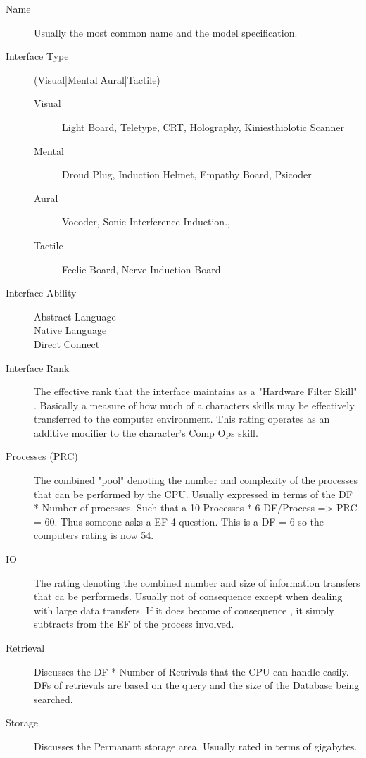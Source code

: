 \begin{description}
	\item[Name]
	Usually the most common name and the model specification.
	\item[Interface Type]
	(Visual|Mental|Aural|Tactile)
	\begin{description}
		\item[Visual]
		Light Board, Tele\-type, CRT, Holog\-ra\-phy, Kini\-esthi\-olotic Scanner
		\item[Mental]
		Droud Plug, Induction Helmet, Empathy Board, Psicoder
		\item[Aural]
		Vocoder, Sonic Interference Induction.,
		\item[Tactile]
		Feelie Board, Nerve Induction Board
	\end{description}
	\item[Interface Ability]
	\begin{description}
		\item[Abstract Language]
		\item[Native Language]
		\item[Direct Connect]
	\end{description}
    \item[Interface Rank]
    The effective rank that the interface maintains as a "Hardware 
	Filter Skill" . Basically a measure of how much of a characters 
	skills may be effectively transferred to the computer environment.
        This rating operates as an additive modifier to the character's 
        Comp Ops skill.
	\item[Processes (PRC)]
	The combined "pool" denoting the number and complexity of the processes
	that can be performed by the CPU.  Usually expressed in terms of the DF
	* Number of processes. Such that a 10 Processes * 6 DF/Process => PRC =
	60. Thus someone asks a EF 4 question. This is a DF = 6 so the computers
	rating is now 54.
	\item[IO]
	The rating denoting the combined number and size of information
	transfers that ca be performeds. Usually not of consequence except when
	dealing with large data transfers. If it does become of consequence , it simply subtracts from the EF of
	the process involved.
	\item[Retrieval]
	Discusses the DF * Number of Retrivals that the CPU can handle easily.
	DFs of retrievals are based on the query and the size of the Database
	being searched.
	\item[Storage]
	Discusses the Permanant storage area. Usually rated in terms of gigabytes.
\end{description}


